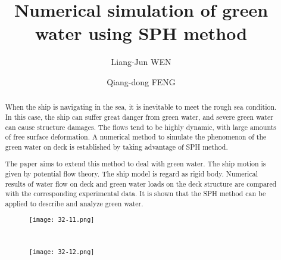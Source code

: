 \documentclass[10pt]{article}
\title{Numerical simulation of green water using SPH method}
\date{}
\author[$\relax$]{Liang-Jun WEN}
\author[$\relax$]{Qiang-dong FENG}
\affil[$\relax$]{China Ship Scientific Research Center, Wuxi 214082,China}
\begin{document}
\maketitle


\begin{abstract}
When the ship is navigating in the sea, it is inevitable to meet the rough sea condition. In this case, the ship can suffer great danger from green water, and severe green water can cause structure damages. The flows tend to be highly dynamic, with large amounts of free surface deformation. A numerical method to simulate the phenomenon of the green water on deck is established by taking advantage of SPH method.

The paper aims to extend this method to deal with green water. The ship motion is given by potential flow theory. The ship model is regard as rigid body. Numerical results of water flow on deck and green water loads on the deck structure are compared with the corresponding experimental data. It is shown that the SPH method can be applied to describe and analyze green water.

\begin{figure}[!htb]
\begin{minipage}[b]{0.44\linewidth}
\centering
\texttt{[image: 32-11.png]}
\end{minipage}
\begin{minipage}[b]{0.05\linewidth}
~
\end{minipage}
\begin{minipage}[b]{0.48\linewidth}
\centering
\texttt{[image: 32-12.png]}
\end{minipage}
\end{figure}

\end{abstract}



\addbib
\end{document}
